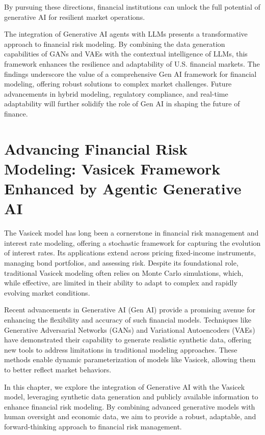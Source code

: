 \documentclass[a4paper,headinclude=on,footinclude=on,12pt,oneside]{scrbook}
\begin{document}
	By pursuing these directions, financial institutions can unlock the full potential of generative AI for resilient market operations.
	
	
	The integration of Generative AI agents with LLMs presents a transformative approach to financial risk modeling. By combining the data generation capabilities of GANs and VAEs with the contextual intelligence of LLMs, this framework enhances the resilience and adaptability of U.S. financial markets. The findings underscore the value of a comprehensive Gen AI framework for financial modeling, offering robust solutions to complex market challenges. Future advancements in hybrid modeling, regulatory compliance, and real-time adaptability will further solidify the role of Gen AI in shaping the future of finance.
	
	
	
	\chapter{Advancing Financial Risk Modeling: Vasicek Framework Enhanced by Agentic Generative AI}
	
	
	The Vasicek model has long been a cornerstone in financial risk management and interest rate modeling, offering a stochastic framework for capturing the evolution of interest rates. Its applications extend across pricing fixed-income instruments, managing bond portfolios, and assessing risk. Despite its foundational role, traditional Vasicek modeling often relies on Monte Carlo simulations, which, while effective, are limited in their ability to adapt to complex and rapidly evolving market conditions.
	
	Recent advancements in Generative AI (Gen AI) provide a promising avenue for enhancing the flexibility and accuracy of such financial models. Techniques like Generative Adversarial Networks (GANs) and Variational Autoencoders (VAEs) have demonstrated their capability to generate realistic synthetic data, offering new tools to address limitations in traditional modeling approaches. These methods enable dynamic parameterization of models like Vasicek, allowing them to better reflect market behaviors.
	
	In this chapter, we explore the integration of Generative AI with the Vasicek model, leveraging synthetic data generation and publicly available information to enhance financial risk modeling. By combining advanced generative models with human oversight and economic data, we aim to provide a robust, adaptable, and forward-thinking approach to financial risk management.
	
\end{document}
